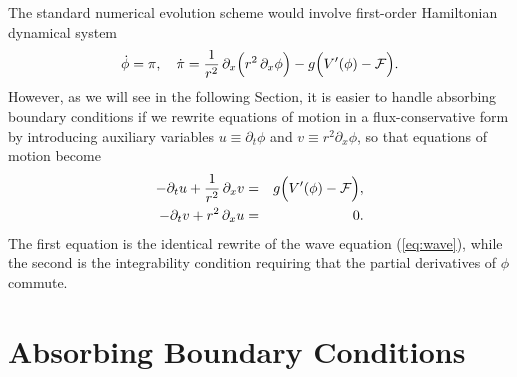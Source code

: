 \documentclass[aps,prd,reprint,twocolumn,groupedaddress]{revtex4-1}
\begin{document}
The standard numerical evolution scheme would involve first-order Hamiltonian dynamical system
\begin{equation}
  \dot\phi = \pi, \hspace{1em}
  \dot\pi = \frac{1}{r^2}\, \partial_x \Big( r^2\, \partial_x \phi \Big) - g \Big( V'(\phi) - {\cal F} \Big).
\end{equation}
However, as we will see in the following Section, it is easier to handle absorbing boundary conditions if we rewrite equations of motion in a flux-conservative form by introducing auxiliary variables $u \equiv \partial_t \phi$ and $v \equiv r^2 \partial_x \phi$, so that equations of motion become
\begin{eqnarray}\label{eq:flux}
  - \partial_t u + \frac{1}{r^2}\, \partial_x v &=& g \Big( V'(\phi) - {\cal F} \Big),\nonumber\\
  - \partial_t v + r^2\, \partial_x u &=& 0.
\end{eqnarray}
The first equation is the identical rewrite of the wave equation (\ref{eq:wave}), while the second is the integrability condition requiring that the partial derivatives of $\phi$ commute.

\section{Absorbing Boundary Conditions}
\end{document}
